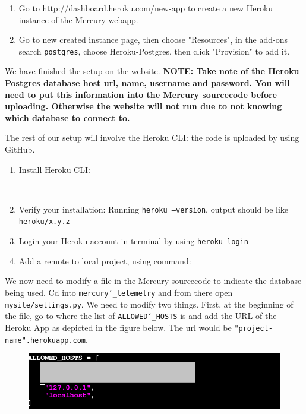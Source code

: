 \documentclass[12pt, letterpaper]{article}
\begin{document}
{{{{{{{{{{{{\begin{enumerate}
		\item Go to \url{http://dashboard.heroku.com/new-app} to create a new Heroku instance of the Mercury webapp.
		\item Go to new created instance page, then choose "Resources", in the add-ons search \texttt{postgres}, choose Heroku-Postgres, then click "Provision" to add it. 
	\end{enumerate} 
\par We have finished the setup on the website. \textbf{NOTE: Take note of the Heroku Postgres database host url, name, username and password. You will need to put this information into the Mercury sourcecode before uploading. Otherwise the website will not run due to not knowing which database to connect to.}
\par The rest of our setup will involve the Heroku CLI: the code is uploaded by using GitHub. 
\begin{enumerate}
	\item Install Heroku CLI: \\
	\par{} \\
	\item Verify your installation: Running \texttt{heroku --version}, output should be like \texttt{heroku/x.y.z}
	\item Login your Heroku account in terminal by using \texttt{heroku login}
	\item Add a remote to local project, using command: \\
	 \par{}
\end{enumerate}
\newpage \par We now need to modify a file in the Mercury sourcecode to indicate the database being used. Cd into \texttt{mercury\char`_telemetry} and from there open \texttt{mysite/settings.py}. We need to modify two things. First, at the beginning of the file, go to where the list of \texttt{ALLOWED\char`_HOSTS} is and add the URL of the Heroku App as depicted in the figure below. The url would be \texttt{"project-name".herokuapp.com}. 
\begin{figure}[h!]
	\centering
	\includegraphics[width=1\columnwidth]{assets/allowed_hosts.png}

\end{figure}}}}}}}}}}}}}
\end{document}
